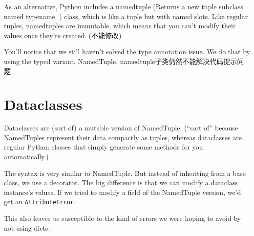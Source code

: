 As an alternative, Python includes a \href{https://docs.python.org/3/library/collections.html#collections.namedtuple}{namedtuple} (Returns a new tuple subclass named typename. ) class, which is like a tuple but with
named slots. Like regular tuples, namedtuples are immutable, which means that you can't modify
their values once they're created. (不能修改)

You'll notice that we still haven't solved the type annotation issue. We do that by using
the typed variant, NamedTuple. namedtuple子类仍然不能解决代码提示问题

\section{Dataclasses}
Dataclasses are (sort of) a mutable version of NamedTuple. (“sort of” because
NamedTuples represent their data compactly as tuples, whereas dataclasses are regular
Python classes that simply generate some methods for you automatically.)

The syntax is very similar to NamedTuple. But instead of inheriting from a base class,
we use a decorator. The big difference is that we can modify a dataclass instance's values.
If we tried to modify a field of the NamedTuple version, we'd get an \verb|AttributeError|.

This also leaves us susceptible to the kind of errors we were hoping to avoid by not
using dicts.
